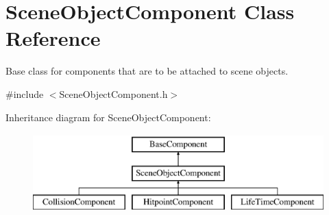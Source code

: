 \hypertarget{class_scene_object_component}{}\section{Scene\+Object\+Component Class Reference}
\label{class_scene_object_component}


Base class for components that are to be attached to scene objects.  




{\ttfamily \#include $<$Scene\+Object\+Component.\+h$>$}

Inheritance diagram for Scene\+Object\+Component\+:\begin{figure}[H]
\begin{center}
\leavevmode
\includegraphics[height=3.000000cm]{class_scene_object_component}
\end{center}
\end{figure}
